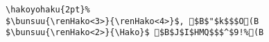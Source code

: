 \begin{verbatim}
\hakoyohaku{2pt}%
$\bunsuu{\renHako<3>}{\renHako<4>}$, $B$"$k$$$O(B 
$\bunsuu{\renHako<2>}{\Hako}$ $B$J$I$HMQ$$$^$9!%(B
\end{verbatim}
